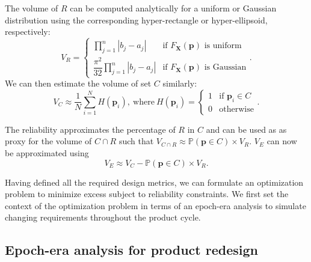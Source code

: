The volume of $R$ can be computed analytically for a uniform or Gaussian distribution using the corresponding hyper-rectangle or hyper-ellipsoid, respectively:
%
\begin{equation} \label{eq:Rmontecarlo}
	V_R = {\begin{cases} \prod\limits_{j=1}^{n} \left|b_j - a_j\right| &{\text{if }}F_\mathbf{X}(\mathbf{p})\text{ is uniform}\\\dfrac{\pi^2}{32}\prod\limits_{j=1}^{n} \left|b_j - a_j\right| &{\text{if }}F_\mathbf{X}(\mathbf{p})\text{ is Gaussian}\end{cases}}.
\end{equation}
%
We can then estimate the volume of set $C$ similarly:
%
\begin{equation} \label{eq:Cmontecarlo}
	V_C \approx \dfrac{1}{N} {\sum\limits_{i=1}^{N} H\left(\mathbf{p}_i\right)}, ~\mathrm{where}~ H\left(\mathbf{p}_i\right)={\begin{cases}1&{\text{if }}\mathbf{p}_i\in C\\0&{\text{otherwise}}\end{cases}}.
\end{equation}

The reliability approximates the percentage of $R$ in $C$ and can be used as as proxy for the volume of $C\cap R$ such that $V_{C\cap R} \approx \mathbb{P}(\mathbf{p} \in C) \times V_R$. $V_E$ can now be approximated using
%
\begin{equation} \label{eq:excesssimple}
	V_E \approx V_C - \mathbb{P}(\mathbf{p} \in C) \times V_R.
\end{equation}

Having defined all the required design metrics, we can formulate an optimization problem to minimize excess subject to reliability constraints. We first set the context of the optimization problem in terms of an epoch-era analysis \cite{Ross2008} to simulate changing requirements throughout the product cycle.

\subsection{Epoch-era analysis for product redesign} \label{subsec:epochera}

